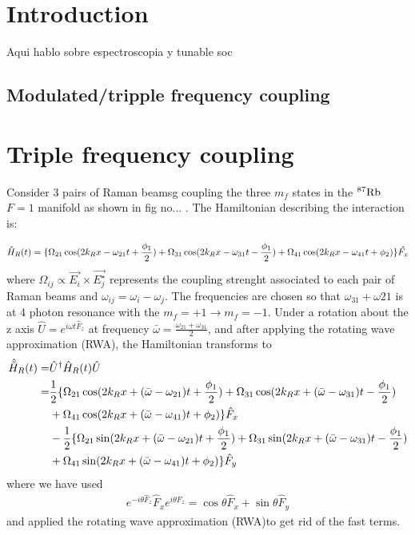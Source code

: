 \section{Introduction}
Aqui hablo sobre espectroscopia y tunable soc

\subsection{Modulated/tripple frequency coupling}


\section{Triple frequency coupling}
Consider 3 pairs of Raman beamsg coupling the three $m_f$ states in the $\Rb87$ $F=1$ manifold as shown in fig no... . The Hamiltonian describing the interaction is: 

%
\begin{align}
\hat{H}_R(t) = \lbrace\Omega_{21}\cos(2{{k_R}} x-\omega_{21} t +\frac{\phi_1}{2})+\Omega_{31}\cos(2{{k_R}} x-\omega_{31} t-\frac{\phi_1}{2})+\Omega_{41}\cos(2{{k_R}} x-\omega_{41} t + \phi_2)\rbrace\hat{F_x}
\end{align}
%
%
where $\Omega_{ij}\propto \vec{E_i}\times\vec{E_j^{\star}}$ represents the coupling strenght associated to each pair of Raman beams and $\omega_{ij} = \omega_{i}-\omega_{j} $. The frequencies are chosen so that $\omega_{31} + \omega{21}$ is at 4 photon resonance with the $m_f = +1\rightarrow m_f = -1$. Under a rotation about the z axis $\hat{U} = e^{i\omega t\hat{F}_z}$ at frequency $\bar{\omega} = \frac{\omega_{21}+\omega_{31}}{2}$, and after applying the rotating wave approximation (RWA), the Hamiltonian transforms to 
%
%
\begin{align}
\begin{split}
\hat{\tilde{H}}_R(t) = & \hat{U}^{\dagger} \hat{H}_R(t)\hat{U} \\
= & \frac{1}{2}\lbrace\Omega_{21}\cos(2{{k_R}} x+(\bar{\omega}-\omega_{21}) t +\frac{\phi_1}{2})+\Omega_{31}\cos(2{{k_R}} x+(\bar{\omega}-\omega_{31}) t -\frac{\phi_1}{2}) \\
& +\Omega_{41}\cos(2{{k_R}} x+(\bar{\omega}-\omega_{41}) t + \phi_2)\rbrace \hat{F}_x \\
& -  \frac{1}{2}\lbrace\Omega_{21}\sin(2{{k_R}} x+(\bar{\omega}-\omega_{21}) t +\frac{\phi_1}{2})+\Omega_{31}\sin(2{{k_R}} x+(\bar{\omega}-\omega_{31}) t-\frac{\phi_1}{2})\\
&+\Omega_{41}\sin(2{{k_R}} x+(\bar{\omega}-\omega_{41}) t+\phi_2)\rbrace \hat{F}_y
\end{split}
\end{align}
%
%
where we have used 
%
\begin{align}
e^{-i\theta \hat{F}_z} \hat{F}_x e^{i\theta \hat{F}_z}= \cos\theta \hat{F}_x + \sin\theta\hat{F}_y
\end{align}
%
and applied the rotating wave approximation (RWA)to get rid of the fast terms. 

